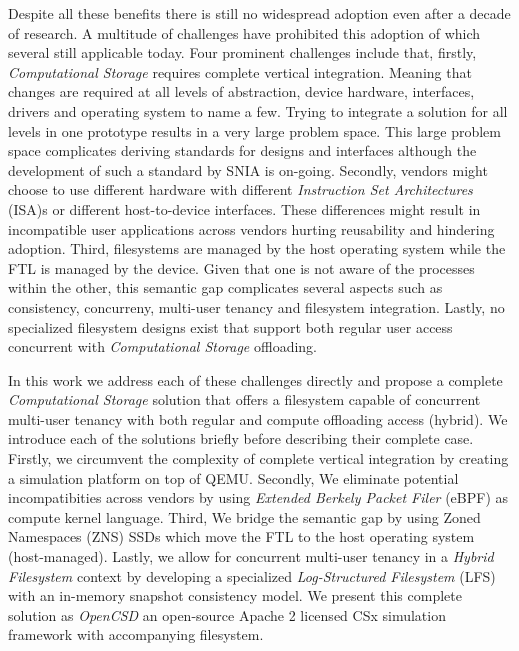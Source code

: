 \documentclass[conference]{IEEEtran}
\begin{document}

Despite all these benefits there is still no widespread adoption even after a
decade of research\cite{lukken2021past}. A multitude of challenges
have prohibited this adoption of which several still applicable today. Four
prominent challenges include that, firstly, \textit{Computational Storage}
requires complete vertical integration. Meaning that changes are required at all
levels of abstraction, device hardware, interfaces, drivers and operating system
to name a few. Trying to integrate a solution for all levels in one prototype
results in a very large problem space. This large problem space complicates
deriving standards for designs and interfaces although the development of such a
standard by SNIA is on-going\cite{snia-model}. Secondly, vendors might choose to
use different hardware with different
\textit{Instruction Set Architectures} (ISA)s or different host-to-device
interfaces. These differences might result in incompatible user applications
across vendors hurting reusability and hindering adoption. Third, filesystems
are managed by the host operating system while the FTL is
managed by the device. Given that one is not aware of the processes within the
other, this semantic gap complicates several aspects such as consistency,
concurreny, multi-user tenancy and filesystem integration. Lastly, no
specialized filesystem designs exist that support both regular user access
concurrent with \textit{Computational Storage} offloading.


In this work we address each of these challenges directly and propose a
complete \textit{Computational Storage} solution that offers a filesystem
capable of concurrent multi-user tenancy with both regular and compute
offloading access (hybrid). We introduce each of the solutions briefly before
describing their complete case. Firstly, we circumvent the complexity of
complete vertical integration by creating a simulation platform on top of
QEMU\cite{qemu}. Secondly, We eliminate potential incompatibities across vendors
by using \textit{Extended Berkely Packet Filer} (eBPF)\cite{what-ebpf} as
compute kernel language. Third, We bridge the semantic gap by using Zoned
Namespaces (ZNS)\cite{zns} SSDs which move the FTL to the host operating
system (host-managed). Lastly, we allow for concurrent multi-user tenancy in
a \textit{Hybrid Filesystem} context by developing a specialized
\textit{Log-Structured Filesystem} (LFS)\cite{Rosenblum1992TheDA} with an
in-memory snapshot consistency model\cite{Viotti2016ConsistencyIN}. We present
this complete solution as \textit{OpenCSD} an open-source Apache 2 licensed CSx
simulation framework with accompanying filesystem\cite{qemu-csd}.
\end{document}
